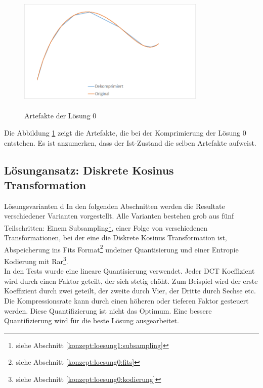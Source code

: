 \begin{figure}[!htbp]
	\center
	\includegraphics[width=0.8\textwidth,height=6cm,keepaspectratio]{./pictures/resultate/loesung0/loesung0_artefakte.png}
	\caption{Artefakte der Lösung 0}
	\label{resultate:loesung0:artefakte}
\end{figure}
Die Abbildung \ref{resultate:loesung0:artefakte} zeigt die Artefakte, die bei der Komprimierung der Lösung 0 entstehen. Es ist anzumerken, dass der Ist-Zustand die selben Artefakte aufweist.

\subsection{Lösungansatz: Diskrete Kosinus Transformation}
Lösungsvarianten
d
In den folgenden Abschnitten werden die Resultate verschiedener Varianten vorgestellt. Alle Varianten bestehen grob aus fünf Teilschritten: Einem Subsampling\footnote{siehe Abschnitt \ref{konzept:loesung1:subsampling}}, einer Folge von verschiedenen Transformationen, bei der eine die Diskrete Kosinus Transformation ist, Abspeicherung ins Fits Format\footnote{siehe Abschnitt \ref{konzept:loesung0:fits}} undeiner Quantisierung und einer Entropie Kodierung mit Rar\footnote{siehe Abschnitt \ref{konzept:loesung0:kodierung}}.\\
[\baselineskip]
In den Tests wurde eine lineare Quantisierung verwendet. Jeder DCT Koeffizient wird durch einen Faktor geteilt, der sich stetig ehöht. Zum Beispiel wird der erste Koeffizient durch zwei geteilt, der zweite durch Vier, der Dritte durch Sechse etc.  Die Kompressionsrate kann durch einen höheren oder tieferen Faktor gesteuert werden. Diese Quantifizierung ist nicht das Optimum. Eine bessere Quantifizierung wird für die beste Lösung ausgearbeitet.

